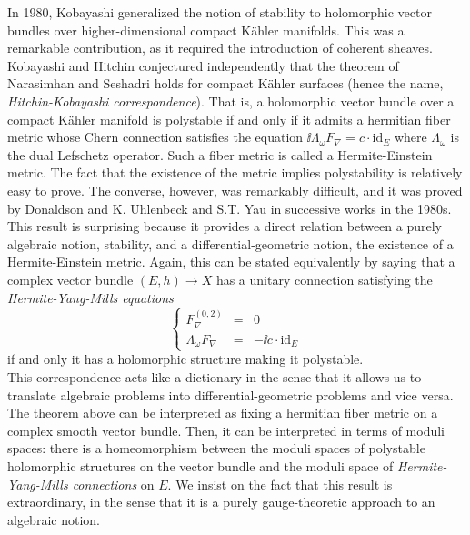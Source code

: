 In 1980, Kobayashi generalized the notion of stability to holomorphic vector bundles over higher-dimensional compact Kähler manifolds. This was a remarkable contribution, as it required the introduction of coherent sheaves. Kobayashi and Hitchin conjectured independently that the theorem of Narasimhan and Seshadri holds for compact Kähler surfaces (hence the name, \textit{Hitchin-Kobayashi correspondence}). That is, a holomorphic vector bundle over a compact Kähler manifold is polystable if and only if it admits a hermitian fiber metric whose Chern connection satisfies the equation \(\ii \Lambda_\omega F_\nabla=c\cdot \mathrm{id}_E\) where \(\Lambda_\omega\) is the dual Lefschetz operator. Such a fiber metric is called a Hermite-Einstein metric. The fact that the existence of the metric implies polystability is relatively easy to prove. The converse, however, was remarkably difficult, and it was proved by Donaldson and K. Uhlenbeck and S.T. Yau in successive works in the 1980s. This result is surprising because it provides a direct relation between a purely algebraic notion, stability, and a differential-geometric notion, the existence of a Hermite-Einstein metric. Again, this can be stated equivalently by saying that a complex vector bundle \((E,h)\to X\) has a unitary connection satisfying the \textit{Hermite-Yang-Mills equations}
\[
\left\{
\begin{array}{ccc}
    F_\nabla^{(0,2)} & = & 0 \\
    \Lambda_\omega F_\nabla & = & -\ii c \cdot \mathrm{id}_E
\end{array}
\right.
\]
if and only it has a holomorphic structure making it polystable. \\

This correspondence acts like a dictionary in the sense that it allows us to translate algebraic problems into differential-geometric problems and vice versa. The theorem above can be interpreted as fixing a hermitian fiber metric on a complex smooth vector bundle. Then, it can be interpreted in terms of moduli spaces: there is a homeomorphism between the moduli spaces of polystable holomorphic structures on the vector bundle and the moduli space of \textit{Hermite-Yang-Mills connections} on \(E\). We insist on the fact that this result is extraordinary, in the sense that it is a purely gauge-theoretic approach to an algebraic notion.\\

